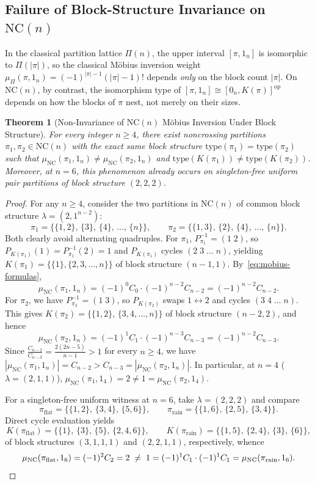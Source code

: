 \documentclass[11pt]{article}
\newtheorem{theorem}{Theorem}[section]
\theoremstyle{definition}
\newcommand{\NC}{\mathrm{NC}}
\newcommand{\btype}{\mathrm{type}}
\newcommand{\Krew}{K}
\begin{document}
\subsection{Failure of Block-Structure Invariance on \texorpdfstring{$\NC(n)$}{NC(n)}}
In the classical partition lattice $\Pi(n)$, the upper interval $[\pi, 1_n]$ is isomorphic to $\Pi(|\pi|)$, so the classical M\"obius inversion weight $\mu_\Pi(\pi, 1_n) = (-1)^{|\pi|-1}(|\pi|-1)!$ depends \emph{only} on the block count $|\pi|$. On $\NC(n)$, by contrast, the isomorphism type of $[\pi, 1_n] \cong [0_n, \Krew(\pi)]^{\mathrm{op}}$ depends on how the blocks of $\pi$ nest, not merely on their sizes.

\begin{theorem}[Non-Invariance of $\NC(n)$ M\"obius Inversion Under Block Structure]\label{thm:non-invariance}
For every integer $n \ge 4$, there exist noncrossing partitions $\pi_1, \pi_2 \in \NC(n)$ with the exact same block structure $\btype(\pi_1) = \btype(\pi_2)$ such that $\mu_{\NC}(\pi_1, 1_n) \neq \mu_{\NC}(\pi_2, 1_n)$ and $\btype(\Krew(\pi_1)) \neq \btype(\Krew(\pi_2))$. Moreover, at $n = 6$, this phenomenon already occurs on singleton-free uniform pair partitions of block structure $(2,2,2)$.
\end{theorem}
\begin{proof}
For any $n \ge 4$, consider the two partitions in $\NC(n)$ of common block structure $\lambda = (2, 1^{n-2})$:
\[
  \pi_1 = \bigl\{\{1,2\},\,\{3\},\,\{4\},\,\dots,\,\{n\}\bigr\}, \qquad
  \pi_2 = \bigl\{\{1,3\},\,\{2\},\,\{4\},\,\dots,\,\{n\}\bigr\}.
\]
Both clearly avoid alternating quadruples. For $\pi_1$, $P_{\pi_1}^{-1} = (1\;2)$, so $P_{\Krew(\pi_1)}(1) = P_{\pi_1}^{-1}(2) = 1$ and $P_{\Krew(\pi_1)}$ cycles $(2\;3\;\dots\;n)$, yielding $\Krew(\pi_1) = \{\{1\}, \{2,3,\dots,n\}\}$ of block structure $(n-1, 1)$. By~\eqref{eq:mobius-formulas},
\[
  \mu_{\NC}(\pi_1, 1_n) = (-1)^0 C_0 \cdot (-1)^{n-2} C_{n-2} = (-1)^{n-2} C_{n-2}.
\]
For $\pi_2$, we have $P_{\pi_2}^{-1} = (1\;3)$, so $P_{\Krew(\pi_2)}$ swaps $1 \leftrightarrow 2$ and cycles $(3\;4\;\dots\;n)$. This gives $\Krew(\pi_2) = \{\{1,2\},\,\{3,4,\dots,n\}\}$ of block structure $(n-2, 2)$, and hence
\[
  \mu_{\NC}(\pi_2, 1_n) = (-1)^1 C_1 \cdot (-1)^{n-3} C_{n-3} = (-1)^{n-2} C_{n-3}.
\]
Since $\frac{C_{n-2}}{C_{n-3}} = \frac{2(2n-5)}{n-1} > 1$ for every $n \ge 4$, we have $|\mu_{\NC}(\pi_1, 1_n)| = C_{n-2} > C_{n-3} = |\mu_{\NC}(\pi_2, 1_n)|$. In particular, at $n = 4$ ($\lambda = (2,1,1)$), $\mu_{\NC}(\pi_1, 1_4) = 2 \neq 1 = \mu_{\NC}(\pi_2, 1_4)$.

For a singleton-free uniform witness at $n = 6$, take $\lambda = (2,2,2)$ and compare
\[
  \pi_{\mathrm{flat}} = \bigl\{\{1,2\},\,\{3,4\},\,\{5,6\}\bigr\}, \qquad
  \pi_{\mathrm{rain}} = \bigl\{\{1,6\},\,\{2,5\},\,\{3,4\}\bigr\}.
\]
Direct cycle evaluation yields
\[
  \Krew(\pi_{\mathrm{flat}}) = \bigl\{\{1\},\,\{3\},\,\{5\},\,\{2,4,6\}\bigr\}, \qquad
  \Krew(\pi_{\mathrm{rain}}) = \bigl\{\{1,5\},\,\{2,4\},\,\{3\},\,\{6\}\bigr\},
\]
of block structures $(3,1,1,1)$ and $(2,2,1,1)$, respectively, whence
\[
  \mu_{\NC}(\pi_{\mathrm{flat}}, 1_6) = (-1)^2 C_2 = 2
  \;\neq\;
  1 = (-1)^1 C_1 \cdot (-1)^1 C_1 = \mu_{\NC}(\pi_{\mathrm{rain}}, 1_6). \qedhere
\]
\end{proof}
\end{document}
